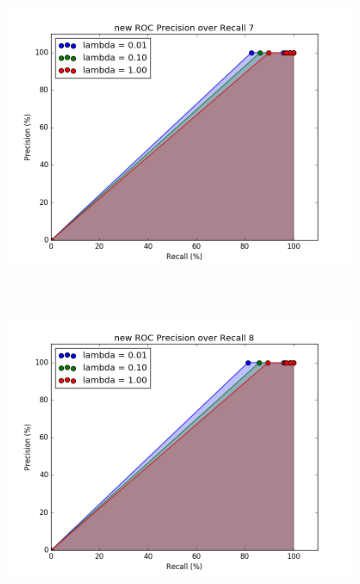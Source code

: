 \documentclass[12pt]{article}
\begin{document}
\begin{figure}[h!]
            \begin{subfigure}[t]{0.5\textwidth}
        \centering
        \includegraphics[width=1.\textwidth]{graphs/problem4_ROC7}
        \caption{}
    \end{subfigure}%
    ~ 
    \begin{subfigure}[t]{0.5\textwidth}
        \centering
        \includegraphics[width=1.\textwidth]{graphs/problem4_ROC8}
        \caption{}
    \end{subfigure}%
\end{figure}
\end{document}
